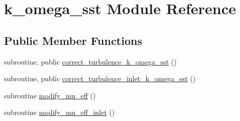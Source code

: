 \hypertarget{classk__omega__sst}{\section{k\-\_\-omega\-\_\-sst Module Reference}
\label{classk__omega__sst}
}
\subsection*{Public Member Functions}
\begin{DoxyCompactItemize}
\item 
subroutine, public \hyperlink{classk__omega__sst_ada04287ba03e5bcd1e2513c5a1fb6f42}{correct\-\_\-turbulence\-\_\-k\-\_\-omega\-\_\-sst} ()
\item 
subroutine, public \hyperlink{classk__omega__sst_a7517fe9a1330e8b029752fc148aefa1c}{correct\-\_\-turbulence\-\_\-inlet\-\_\-k\-\_\-omega\-\_\-sst} ()
\item 
subroutine \hyperlink{classk__omega__sst_a9db01a58eaa429bcca05b716220b3b6b}{modify\-\_\-mu\-\_\-eff} ()
\item 
subroutine \hyperlink{classk__omega__sst_a62e6772f2e804ba58b79c623435a5e1b}{modify\-\_\-mu\-\_\-eff\-\_\-inlet} ()
\end{DoxyCompactItemize}

